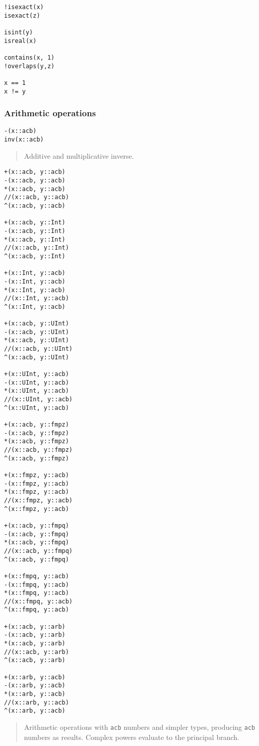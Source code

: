 \documentclass[a4paper,10pt]{article}
\newcommand{\code}{\lstinline}
\newcommand{\desc}[1]{\vspace{-3mm}\begin{quote}#1\end{quote}}
\begin{document}
{{\begin{lstlisting}
!isexact(x)
isexact(z)

isint(y)
isreal(x)

contains(x, 1)
!overlaps(y,z)

x == 1
x != y
\end{lstlisting}

\subsubsection{Arithmetic operations}

\begin{lstlisting}
-(x::acb)
inv(x::acb)
\end{lstlisting}

\desc{Additive and multiplicative inverse.}

\begin{lstlisting}
+(x::acb, y::acb)
-(x::acb, y::acb)
*(x::acb, y::acb)
//(x::acb, y::acb)
^(x::acb, y::acb)

+(x::acb, y::Int)
-(x::acb, y::Int)
*(x::acb, y::Int)
//(x::acb, y::Int)
^(x::acb, y::Int)

+(x::Int, y::acb)
-(x::Int, y::acb)
*(x::Int, y::acb)
//(x::Int, y::acb)
^(x::Int, y::acb)

+(x::acb, y::UInt)
-(x::acb, y::UInt)
*(x::acb, y::UInt)
//(x::acb, y::UInt)
^(x::acb, y::UInt)

+(x::UInt, y::acb)
-(x::UInt, y::acb)
*(x::UInt, y::acb)
//(x::UInt, y::acb)
^(x::UInt, y::acb)

+(x::acb, y::fmpz)
-(x::acb, y::fmpz)
*(x::acb, y::fmpz)
//(x::acb, y::fmpz)
^(x::acb, y::fmpz)

+(x::fmpz, y::acb)
-(x::fmpz, y::acb)
*(x::fmpz, y::acb)
//(x::fmpz, y::acb)
^(x::fmpz, y::acb)

+(x::acb, y::fmpq)
-(x::acb, y::fmpq)
*(x::acb, y::fmpq)
//(x::acb, y::fmpq)
^(x::acb, y::fmpq)

+(x::fmpq, y::acb)
-(x::fmpq, y::acb)
*(x::fmpq, y::acb)
//(x::fmpq, y::acb)
^(x::fmpq, y::acb)

+(x::acb, y::arb)
-(x::acb, y::arb)
*(x::acb, y::arb)
//(x::acb, y::arb)
^(x::acb, y::arb)

+(x::arb, y::acb)
-(x::arb, y::acb)
*(x::arb, y::acb)
//(x::arb, y::acb)
^(x::arb, y::acb)
\end{lstlisting}

\desc{Arithmetic operations with \code{acb} numbers and simpler types,
producing \code{acb} numbers as results. Complex powers
evaluate to the principal branch.}

}}
\end{document}
